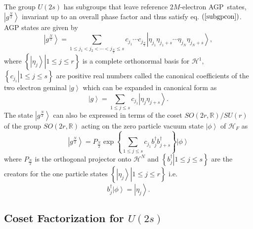 \documentclass[aps,preprint]{revtex4}%
\begin{document}
The group $U\left(  2s\right)  $ has subgroups that leave reference
$2M$-electron AGP\ states,$\left\vert g^{\frac{N}{2}}\right\rangle $ invariant
up to an overall phase factor and thus satisfy eq. $\left(  \ref{subgpcon}%
\right)  $. AGP states are given \cite{Weiner&ortiz04} by%
\begin{equation}
\left\vert g^{\frac{N}{2}}\right\rangle =\sum_{1\leq j_{1}<j_{2}%
<\cdots<j_{\frac{N}{2}}\leq s}c_{j_{1}}\cdots c_{j_{\frac{N}{2}}}\left\vert
\eta_{j_{1}}\eta_{j_{1}+s}\cdots\eta_{j_{N}}\eta_{j_{N}+s}\right\rangle ,
\label{canexp}%
\end{equation}
where $\left\{  \left.  \left\vert \eta_{j}\right\rangle \right\vert 1\leq
j\leq r\right\}  $ is a complete orthonormal basis for $\mathcal{H}^{1},$
$\left\{  \left.  c_{j_{1}}\right\vert 1\leq j\leq s\right\}  $ are positive
real numbers called the canonical coefficients of the two electron geminal
$\left\vert g\right\rangle $ which can be expanded in canonical form as%
\begin{equation}
\left\vert g\right\rangle =\sum_{1\leq j\leq s}c_{j_{1}}\left\vert \eta
_{j}\eta_{j+s}\right\rangle . \label{gemcan}%
\end{equation}
The state $\left\vert g^{\frac{N}{2}}\right\rangle $ can also be expressed in
terms of the coset $SO\left(  2r,\mathbb{R}\right)  /SU\left(  r\right)  $ of
the group $SO\left(  2r,\mathbb{R}\right)  $ acting on the zero particle
vacuum state $\left\vert \phi\right\rangle $ of $\mathcal{H}_{F}$
\cite{Deumens87} as
\begin{equation}
\left\vert g^{\frac{N}{2}}\right\rangle =P_{\frac{N}{2}}\exp\left\{
\sum_{1\leq j\leq s}c_{j_{1}}b_{j}^{\dagger}b_{j+s}^{\dagger}\right\}
\left\vert \phi\right\rangle
\end{equation}
where $P_{\frac{N}{2}}$ is the orthogonal projector onto $\mathcal{H}^{N}$ and
$\left\{  \left.  b_{j}^{\dagger}\right\vert 1\leq j\leq s\right\}  $ are the
creators for the one particle states $\left\{  \left.  \left\vert \eta
_{j}\right\rangle \right\vert 1\leq j\leq r\right\}  $ i.e.
\begin{equation}
b_{j}^{\dagger}\left\vert \phi\right\rangle =\left\vert \eta_{j}\right\rangle
.
\end{equation}


\subsection{Coset Factorization for $U\left(  2s\right)  $\label{factor}}
\end{document}
